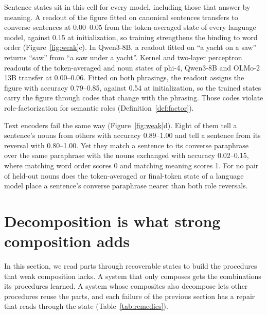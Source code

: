 Sentence states sit in this cell for every model, including those that answer by meaning. A readout of the figure fitted on canonical sentences transfers to converse sentences at 0.00--0.05 from the token-averaged state of every language model, against 0.15 at initialization, so training strengthens the binding to word order (Figure~\ref{fig:weak}c). In Qwen3-8B, a readout fitted on ``a yacht on a saw'' returns ``saw'' from ``a saw under a yacht''. Kernel and two-layer perceptron readouts of the token-averaged and noun states of phi-4, Qwen3-8B and OLMo-2 13B transfer at 0.00--0.06. Fitted on both phrasings, the readout assigns the figure with accuracy 0.79--0.85, against 0.54 at initialization, so the trained states carry the figure through codes that change with the phrasing. Those codes violate role-factorization for semantic roles (Definition~\ref{def:factor}).

Text encoders fail the same way (Figure~\ref{fig:weak}d). Eight of them tell a sentence's nouns from others with accuracy 0.89--1.00 and tell a sentence from its reversal with 0.80--1.00. Yet they match a sentence to its converse paraphrase over the same paraphrase with the nouns exchanged with accuracy 0.02--0.15, where matching word order scores 0 and matching meaning scores 1. For no pair of held-out nouns does the token-averaged or final-token state of a language model place a sentence's converse paraphrase nearer than both role reversals.

\section{Decomposition is what strong composition adds}
\label{sec:success}

In this section, we read parts through recoverable states to build the procedures that weak composition lacks. A system that only composes gets the combinations its procedures learned. A system whose composites also decompose lets other procedures reuse the parts, and each failure of the previous section has a repair that reads through the state (Table~\ref{tab:remedies}).

